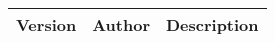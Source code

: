 
\begin{longtable}{llX}
	\toprule
	\bf Version & \bf Author & \bf Description \\
	\toprule
	\endhead
	\bottomrule
\end{longtable}

